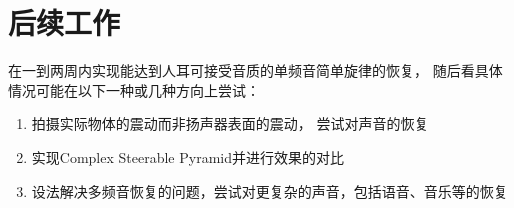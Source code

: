 \section{后续工作}
在一到两周内实现能达到人耳可接受音质的单频音简单旋律的恢复，
随后看具体情况可能在以下一种或几种方向上尝试：
\begin{enumerate}
    \item 拍摄实际物体的震动而非扬声器表面的震动，
        尝试对声音的恢复
    \item 实现Complex Steerable Pyramid并进行效果的对比
    \item 设法解决多频音恢复的问题，尝试对更复杂的声音，包括语音、音乐等的恢复
\end{enumerate}

